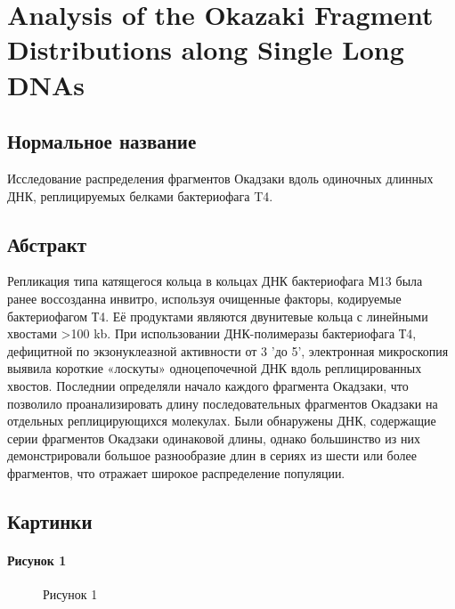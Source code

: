 \section{Analysis of the Okazaki Fragment Distributions along Single Long DNAs}

\subsection{Нормальное название}

Исследование распределения фрагментов Окадзаки вдоль одиночных длинных ДНК, реплицируемых белками бактериофага T4.  

\subsection{Абстракт}

Репликация типа катящегося кольца в кольцах ДНК бактериофага М13 была ранее воссозданна инвитро, используя очищенные факторы, кодируемые бактериофагом Т4. Её продуктами являются двунитевые кольца с линейными хвостами >100 kb. При использовании ДНК-полимеразы бактериофага Т4, дефицитной по экзонуклеазной активности от 3 ’до 5’, электронная микроскопия выявила короткие «лоскуты» одноцепочечной ДНК вдоль реплицированных хвостов. Последнии определяли начало каждого фрагмента Окадзаки, что позволило проанализировать длину последовательных фрагментов Окадзаки на отдельных реплицирующихся молекулах. Были обнаружены ДНК, содержащие серии фрагментов Окадзаки одинаковой длины, однако большинство из них демонстрировали большое разнообразие длин в сериях из шести или более фрагментов, что отражает широкое распределение популяции.

\subsection{Картинки}


\paragraph{Рисунок 1}


\begin{figure}[h]
\begin{minipage}[h]{0.49\linewidth}
\center{\texttt{[image: 5\_1]} }
\end{minipage}
\hfill
\begin{minipage}[h]{0.49\linewidth}
\center{\texttt{[image: 5\_2]} }
\end{minipage}
\label{fig:5_12}
\caption{Рисунок 1}
\end{figure}


